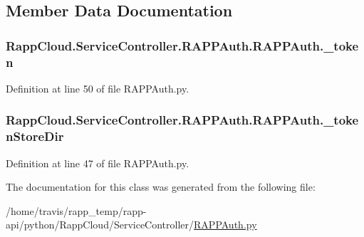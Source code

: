 \subsection{Member Data Documentation}
\hypertarget{classRappCloud_1_1ServiceController_1_1RAPPAuth_1_1RAPPAuth_a1e729169998595ec592b3d742584d3b4}{
\subsubsection[{\-\_\-token}]{\setlength{\rightskip}{0pt plus 5cm}Rapp\-Cloud.\-Service\-Controller.\-R\-A\-P\-P\-Auth.\-R\-A\-P\-P\-Auth.\-\_\-token\hspace{0.3cm}{\ttfamily [private]}}}\label{classRappCloud_1_1ServiceController_1_1RAPPAuth_1_1RAPPAuth_a1e729169998595ec592b3d742584d3b4}


Definition at line 50 of file R\-A\-P\-P\-Auth.\-py.

\hypertarget{classRappCloud_1_1ServiceController_1_1RAPPAuth_1_1RAPPAuth_a4566caf8f02272e821a871776e0f1b8d}{
\subsubsection[{\-\_\-token\-Store\-Dir}]{\setlength{\rightskip}{0pt plus 5cm}Rapp\-Cloud.\-Service\-Controller.\-R\-A\-P\-P\-Auth.\-R\-A\-P\-P\-Auth.\-\_\-token\-Store\-Dir\hspace{0.3cm}{\ttfamily [private]}}}\label{classRappCloud_1_1ServiceController_1_1RAPPAuth_1_1RAPPAuth_a4566caf8f02272e821a871776e0f1b8d}


Definition at line 47 of file R\-A\-P\-P\-Auth.\-py.



The documentation for this class was generated from the following file\-:\begin{DoxyCompactItemize}
\item 
/home/travis/rapp\-\_\-temp/rapp-\/api/python/\-Rapp\-Cloud/\-Service\-Controller/\hyperlink{RAPPAuth_8py}{R\-A\-P\-P\-Auth.\-py}\end{DoxyCompactItemize}

